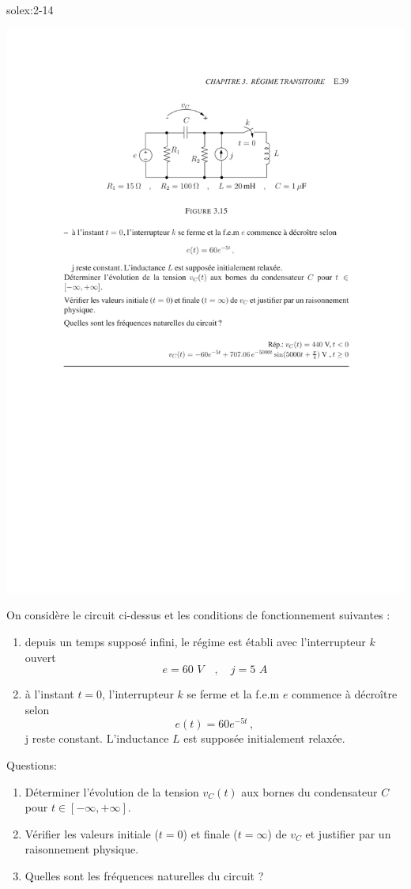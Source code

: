 \begin{exwithsol}{solex:2-14}
\begin{exercise}{}
	\label{ex:2-15}
\begin{center}
	\includegraphics[width=0.7\linewidth]{exercices/ex-3-15}
\end{center}
On consid\`ere le circuit ci-dessus et les conditions de fonctionnement suivantes :
\begin{enumerate}
	\item depuis un temps suppos\'e infini, le r\'egime est \'etabli avec
	l'interrupteur $k$ ouvert
	\[e = 60\,\, V \quad , \quad j= 5 \,\, A\]
	\item \`a l'instant $t=0$, l'interrupteur $k$ se ferme  et la f.e.m $e$
	commence \`a d\'ecro\^itre selon 
	\[ e(t)=60 e^{-5t}\, ,\]
	j reste constant. L'inductance $L$ est suppos\'ee initialement relax\'ee.
\end{enumerate}
Questions:
\begin{enumerate}
\item D\'eterminer l'\'evolution de la tension $v_C(t)$ aux bornes du
condensateur $C$ pour $t \in [-\infty,+\infty]$.
\item V\'erifier les valeurs initiale ($t=0$) et finale ($t=\infty$) de $v_C$
et justifier par un raisonnement physique. 
\item Quelles sont les fr\'equences naturelles du circuit ?
\end{enumerate}


\end{exercise}
\end{exwithsol}
